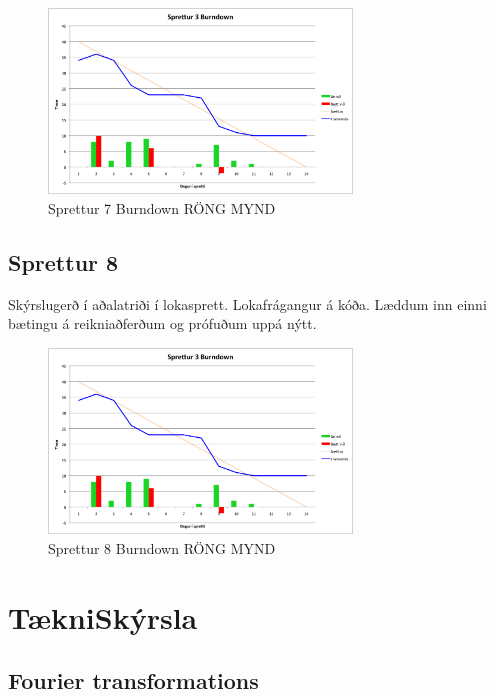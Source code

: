 \documentclass{article}
\begin{document}
\begin{figure}[H]
 \centering
 \includegraphics[width=0.72\textwidth]{Sprettur3_Burndown.png}
 \caption{Sprettur 7 Burndown RÖNG MYND}
\end{figure}

\subsection{Sprettur 8}
Skýrslugerð í aðalatriði í lokasprett. Lokafrágangur á kóða. Læddum inn einni bætingu á reikniaðferðum og prófuðum uppá nýtt.
\begin{figure}[H]
 \centering
 \includegraphics[width=0.72\textwidth]{Sprettur3_Burndown.png}
 \caption{Sprettur 8 Burndown RÖNG MYND}
\end{figure}








\newpage


\section{TækniSkýrsla}


\subsection{Fourier transformations} 
\end{document}
